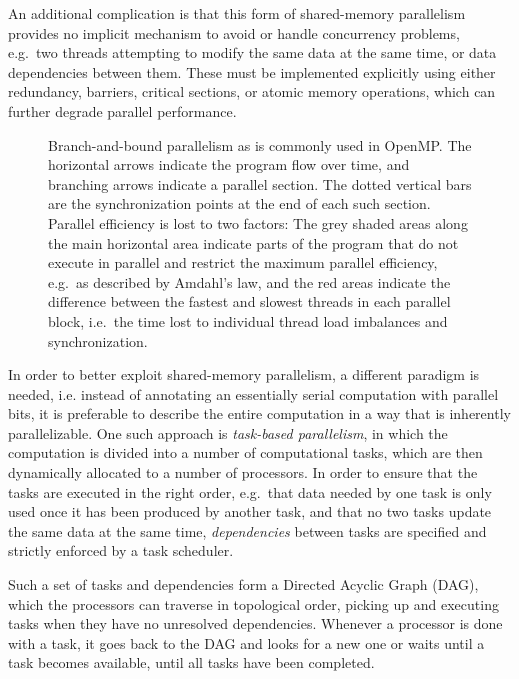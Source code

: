 \documentclass[final]{siamltex}
\begin{document}
An additional complication is that this form of shared-memory
parallelism provides no implicit mechanism to avoid or handle
concurrency problems,
e.g.~two threads attempting to modify the same data at the same time,
or data dependencies between them.
These must be implemented explicitly using either redundancy, barriers,
critical sections, or atomic memory operations, which can further degrade
parallel performance.

\begin{figure}
    \centerline{}
    
    \caption{Branch-and-bound parallelism as is commonly used in OpenMP.
        The horizontal arrows indicate the program flow over time, and
        branching arrows indicate a parallel section. The dotted vertical
        bars are the synchronization points at the end of each such section.
        Parallel efficiency is lost to two factors: The grey shaded areas
        along the main horizontal area indicate parts of the program that
        do not execute in parallel and restrict the maximum parallel
        efficiency, e.g.~as described by Amdahl's law, and the red
        areas indicate the difference between the fastest and slowest
        threads in each parallel block, i.e.~the time lost to
        individual thread load imbalances and synchronization.
        }
    \label{fig:OMPScaling}
\end{figure}


In order to better exploit shared-memory parallelism, 
a different paradigm is needed, i.e. instead
of annotating an essentially serial computation with parallel
bits, it is preferable to describe the entire computation in a way that
is inherently parallelizable.
One such approach is {\em task-based parallelism}, in which the
computation is divided into a number of computational tasks, which are
then dynamically allocated to a number of processors.
In order to ensure that the tasks are executed in the right
order, e.g.~that data needed by one task is only used once it
has been produced by another task, and that no two tasks
update the same data at the same time, {\em dependencies} between
tasks are specified and strictly enforced by a task scheduler.

Such a set of tasks and dependencies form a Directed Acyclic Graph (DAG),
which the processors can traverse in topological order, picking up and
executing tasks when they have no unresolved dependencies.
Whenever a processor is done with a task, it goes back to
the DAG and looks for a new one or waits until a task
becomes available, until all tasks have been completed.
\end{document}
